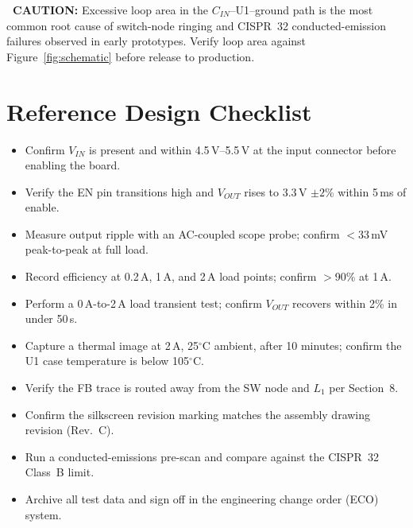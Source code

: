 \documentclass[11pt,a4paper]{article}
\begin{document}
\begin{tcolorbox}[colback=cautionbg,colframe=caution,boxrule=0.7pt,arc=1pt,
  left=8pt,right=8pt,top=5pt,bottom=5pt]
\textbf{\color{caution}\faExclamationTriangle\ CAUTION:} Excessive loop area
in the $C_{IN}$--U1--ground path is the most common root cause of switch-node
ringing and CISPR~32 conducted-emission failures observed in early
prototypes. Verify loop area against Figure~\ref{fig:schematic} before
release to production.
\end{tcolorbox}

\section{Reference Design Checklist}
\begin{itemize}[label=$\square$,leftmargin=1.3em,itemsep=5pt]
\item Confirm $V_{IN}$ is present and within 4.5\,V--5.5\,V at the input
      connector before enabling the board.
\item Verify the EN pin transitions high and $V_{OUT}$ rises to
      3.3\,V $\pm2$\% within 5\,ms of enable.
\item Measure output ripple with an AC-coupled scope probe; confirm
      $<$33\,mV peak-to-peak at full load.
\item Record efficiency at 0.2\,A, 1\,A, and 2\,A load points; confirm
      $>$90\% at 1\,A.
\item Perform a 0\,A-to-2\,A load transient test; confirm $V_{OUT}$
      recovers within 2\% in under 50\,\textmu s.
\item Capture a thermal image at 2\,A, 25$^\circ$C ambient, after 10 minutes;
      confirm the U1 case temperature is below 105$^\circ$C.
\item Verify the FB trace is routed away from the SW node and $L_1$ per
      Section~8.
\item Confirm the silkscreen revision marking matches the assembly drawing
      revision (Rev.~C).
\item Run a conducted-emissions pre-scan and compare against the
      CISPR~32 Class~B limit.
\item Archive all test data and sign off in the engineering change order
      (ECO) system.
\end{itemize}

\end{document}
